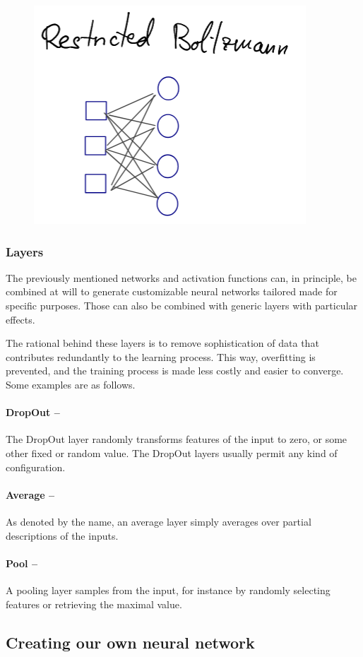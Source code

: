 \documentclass[]{report}
\begin{document}
\begin{figure}
\includegraphics[width = .45\linewidth]{images/restricted boltzmann}
\end{figure}

\subsubsection{Layers}

The previously mentioned networks and activation functions can, in principle, be combined at will to generate customizable neural networks tailored made for specific purposes. Those can also be combined with generic layers with particular effects. 

The rational behind these layers is to remove sophistication of data that contributes redundantly to the learning process. This way, overfitting is prevented, and the training process  is made less costly and easier to converge. Some examples are as follows. 

\paragraph{DropOut --}
The DropOut layer randomly transforms features of the input to zero, or some other fixed or random value. The DropOut layers usually permit any kind of configuration. 


\paragraph{Average --} As denoted by the name, an average layer simply averages over partial descriptions of the inputs. 

\paragraph{Pool -- }A pooling layer samples from the input, for instance by randomly selecting features or retrieving the maximal value. 


\subsection{Creating our own neural network}
\end{document}
